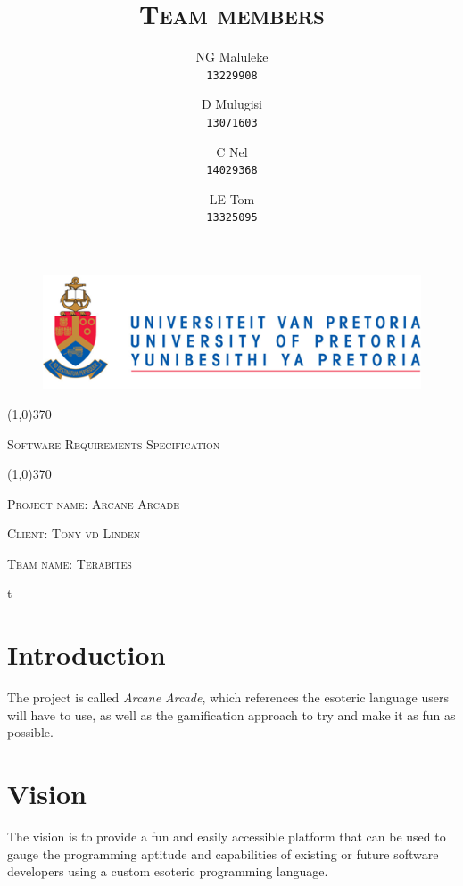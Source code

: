 \documentclass[english]{article}
\title{\scshape\Large Team members}
\author{
	NG Maluleke\\
	\texttt{13229908}
	\and
	D Mulugisi\\
	\texttt{13071603}
	\and
	C Nel\\
	\texttt{14029368}
	\and
	LE Tom\\
	\texttt{13325095}
}
\begin{document}
	
	\begin{figure}
		\includegraphics[width=\linewidth]{up_logo.png}
	\end{figure}
	
	\begin{center}
	 \line(1,0){370}
	\\[0.2cm]
    {\scshape\Large Software Requirements Specification \par}
	\vspace{0.1cm}
	\line(1,0){370}
	\\[0.8cm]
	
	{\scshape\large Project name: Arcane Arcade\par}	
	\vspace{1cm}
	{\scshape\large Client: Tony vd Linden\par}
	\vspace{1cm}
	{\scshape\large Team name: Terabites\par}
	\vspace{1cm}
	{\let\newpage\relax\maketitle}
	\end{center}
	
	
	\newpage
	\tableofcontents

	t\newpage
	
	\section{Introduction}
		 The project is called \textit{Arcane Arcade}, which references the esoteric language users will have to use, as well as the gamification approach to try and make it as fun as possible.

	\section{Vision}
		The vision is to provide a fun and easily accessible platform that can be used to gauge the programming aptitude and capabilities of existing or future software developers using a custom esoteric programming language.
\end{document}
